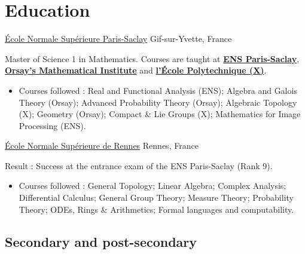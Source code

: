 \documentclass[11pt,letterpaper,sans]{moderncv}
\begin{document}
\makecvtitle

\section{Education}
{\href{https://ens-paris-saclay.fr/}{École Normale Supérieure Paris-Saclay}}
{Gif-sur-Yvette, France}
	{}{
		Master of Science 1 in Mathematics.
		Courses are taught at \href{https://ens-paris-saclay.fr/}{\textbf{ENS Paris-Saclay}}, 
		\href{https://www.imo.universite-paris-saclay.fr/fr/}{\textbf{Orsay's Mathematical Institute}} and 
		\href{https://www.polytechnique.edu/}{\textbf{l'École Polytechnique (X)}}.
		\begin{itemize}
			\item Courses followed : Real and Functional Analysis (ENS); 
			Algebra and Galois Theory (Orsay); Advanced Probability Theory (Orsay);
			Algebraic Topology (X); Geometry (Orsay); Compact \& Lie Groups (X);
			Mathematics for Image Processing (ENS).
		\end{itemize}
	}

{\href{https://ens-rennes.fr/}{École Normale Supérieure de Rennes}}
		{Rennes, France}{}{
			Result : Success at the entrance exam of the ENS Paris-Saclay (Rank 9).
			\begin{itemize}
				\item Courses followed : General Topology; Linear Algebra; Complex Analysis;
				Differential Calculus; General Group Theory; Measure Theory; Probability Theory;
				ODEs, Rings \& Arithmetics; Formal languages and computability.  
			\end{itemize}
		}
\subsection{Secondary and post-secondary}

\end{document}
